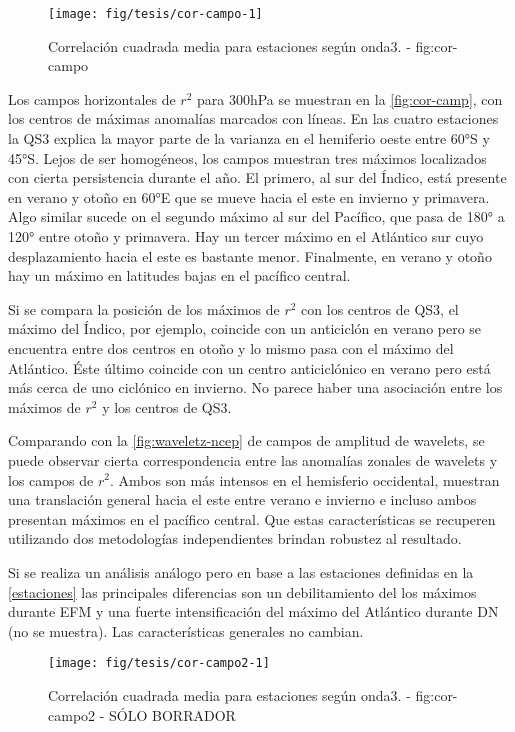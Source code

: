 \documentclass[spanish,a4paper]{book}
\begin{document}
\begin{figure}
\texttt{[image: fig/tesis/cor-campo-1]} \caption{Correlación cuadrada media para estaciones según onda3. - fig:cor-campo}\label{fig:cor-campo}
\end{figure}

Los campos horizontales de \(r^2\) para 300hPa se muestran en la
\autoref{fig:cor-camp}, con los centros de máximas anomalías marcados
con líneas. En las cuatro estaciones la QS3 explica la mayor parte de la
varianza en el hemiferio oeste entre 60°S y 45°S. Lejos de ser
homogéneos, los campos muestran tres máximos localizados con cierta
persistencia durante el año. El primero, al sur del Índico, está
presente en verano y otoño en 60°E que se mueve hacia el este en
invierno y primavera. Algo similar sucede on el segundo máximo al sur
del Pacífico, que pasa de 180° a 120° entre otoño y primavera. Hay un
tercer máximo en el Atlántico sur cuyo desplazamiento hacia el este es
bastante menor. Finalmente, en verano y otoño hay un máximo en latitudes
bajas en el pacífico central.

Si se compara la posición de los máximos de \(r^2\) con los centros de
QS3, el máximo del Índico, por ejemplo, coincide con un anticiclón en
verano pero se encuentra entre dos centros en otoño y lo mismo pasa con
el máximo del Atlántico. Éste último coincide con un centro
anticiclónico en verano pero está más cerca de uno ciclónico en
invierno. No parece haber una asociación entre los máximos de \(r^2\) y
los centros de QS3.

Comparando con la \autoref{fig:waveletz-ncep} de campos de amplitud de
wavelets, se puede observar cierta correspondencia entre las anomalías
zonales de wavelets y los campos de \(r^2\). Ambos son más intensos en
el hemisferio occidental, muestran una translación general hacia el este
entre verano e invierno e incluso ambos presentan máximos en el pacífico
central. Que estas características se recuperen utilizando dos
metodologías independientes brindan robustez al resultado.

Si se realiza un análisis análogo pero en base a las estaciones
definidas en la \autoref{estaciones} las principales diferencias son un
debilitamiento del los máximos durante EFM y una fuerte intensificación
del máximo del Atlántico durante DN (no se muestra). Las características
generales no cambian.

\begin{figure}
\texttt{[image: fig/tesis/cor-campo2-1]} \caption{Correlación cuadrada media para estaciones según onda3. - fig:cor-campo2 - SÓLO BORRADOR}\label{fig:cor-campo2}
\end{figure}
\end{document}
